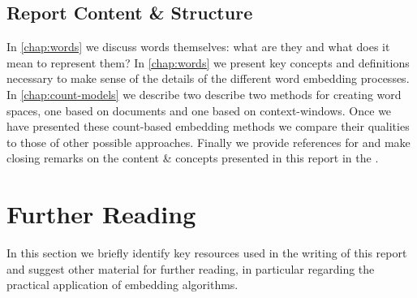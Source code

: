 \documentclass{ucetd}
\begin{document}
\section{Report Content \& Structure}
In \autoref{chap:words} we discuss words themselves: what are they and what does it mean to represent them? In \autoref{chap:words} we present key concepts and definitions necessary to make sense of the details of the different word embedding processes. In \autoref{chap:count-models} we describe two describe two methods for creating word spaces, one based on documents and one based on context-windows. Once we have presented these count-based embedding methods we compare their qualities to those of other possible approaches. Finally we provide references for  and make closing remarks on the content \& concepts presented in this report in the .



\chapter*{Further Reading}\label{chap:further-reading}
In this section we briefly identify key resources used in the writing of this report and suggest other material for further reading, in particular regarding the practical application of embedding algorithms.
\end{document}
